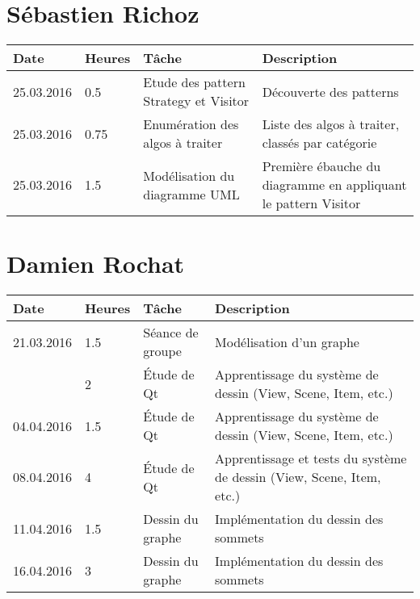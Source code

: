 \documentclass[french]{article}
\begin{document}
	\section*{Sébastien Richoz}
	\begin{tabular}{p{}|p{}|p{}|p{}}
		Date&Heures&Tâche&Description\\
		\hline \hline
		25.03.2016&0.5&Etude des pattern Strategy et Visitor&Découverte des patterns\\
		\hline
		25.03.2016&0.75&Enumération des algos à traiter&Liste des algos à traiter, classés par catégorie\\
		\hline
		25.03.2016&1.5&Modélisation du diagramme UML&Première ébauche du diagramme en appliquant le pattern Visitor\\
	\end{tabular}
	
	\section*{Damien Rochat}
	\begin{tabular}{p{}|p{}|p{}|p{}}
		Date & Heures & Tâche & Description \\
		\hline \hline
		21.03.2016 & 1.5 & Séance de groupe & Modélisation d'un graphe \\	
		           & 2 & Étude de Qt & Apprentissage du système de dessin (View, Scene, Item, etc.) \\
		\hline
		04.04.2016 & 1.5 & Étude de Qt & Apprentissage du système de dessin (View, Scene, Item, etc.) \\
		\hline
		08.04.2016 & 4 & Étude de Qt & Apprentissage et tests du système de dessin (View, Scene, Item, etc.) \\
		\hline
		11.04.2016 & 1.5 & Dessin du graphe & Implémentation du dessin des sommets \\
		\hline
		16.04.2016 & 3 & Dessin du graphe & Implémentation du dessin des sommets \\
	\end{tabular}
	
\end{document}
